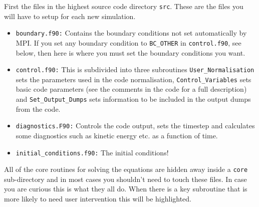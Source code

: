 \documentclass[11pt]{article}
\begin{document}
First the files in the highest source code directory \texttt{src}. These are the files you will have to setup for each new simulation.
\begin{itemize}
 \item{\texttt{boundary.f90:}} Contains the boundary conditions not set automatically by MPI. If you set any boundary condition to \texttt{BC\_OTHER} in \texttt{control.f90}, see below, then here is where you must set the boundary conditions you want. 
  \item{\texttt{control.f90:}} This is subdivided into three subroutines \texttt{User\_Normalisation} sets the parameters used in the code normalisation, \texttt{Control\_Variables} sets basic code parameters  (see the comments in the code for a full description) and
\texttt{Set\_Output\_Dumps} sets information to be included in the output dumps from the code.
 \item{\texttt{diagnostics.F90:}} Controls the code output, sets the timestep and calculates some diagnostics such as kinetic energy etc. as a function of time.
  \item{\texttt{initial\_conditions.f90:}} The initial conditions! 
\end{itemize}
  
All of the core routines for solving the equations are hidden away inside a \texttt{core} sub-directory and in most cases you shouldn't need to touch these files. In case you are curious this is what they all do. When there is a key subroutine that is more likely to need user intervention this will be highlighted.  
  
\end{document}
